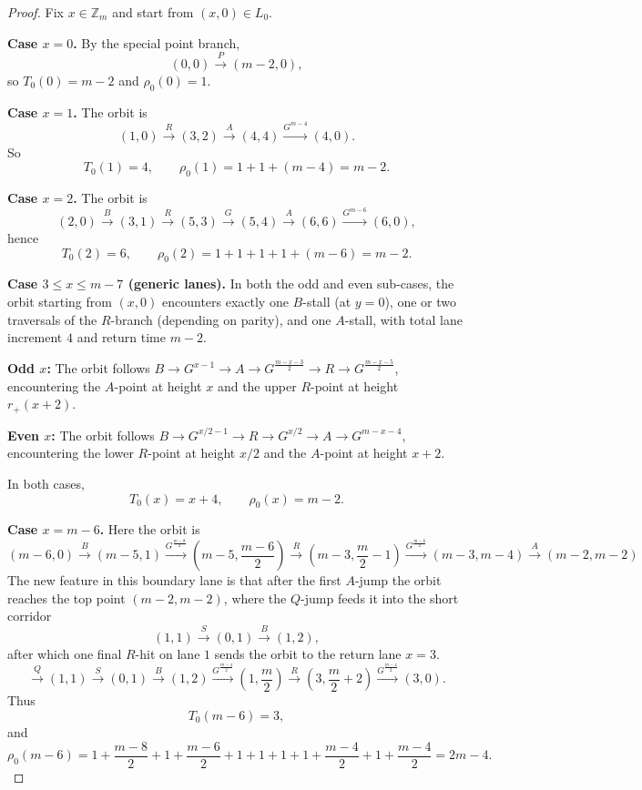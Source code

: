 \documentclass[11pt]{article}
\newcommand{\Zm}{\mathbb Z_m}
\begin{document}
\begin{proof}
Fix $x\in \Zm$ and start from $(x,0)\in L_0$.

\smallskip
\noindent\textbf{Case $x=0$.}
By the special point branch,
\[
(0,0)\xrightarrow{P}(m-2,0),
\]
so $T_0(0)=m-2$ and $\rho_0(0)=1$.

\smallskip
\noindent\textbf{Case $x=1$.}
The orbit is
\[
(1,0)\xrightarrow{R}(3,2)\xrightarrow{A}(4,4)\xrightarrow{G^{m-4}}(4,0).
\]
So
\[
T_0(1)=4,\qquad \rho_0(1)=1+1+(m-4)=m-2.
\]

\smallskip
\noindent\textbf{Case $x=2$.}
The orbit is
\[
(2,0)\xrightarrow{B}(3,1)\xrightarrow{R}(5,3)\xrightarrow{G}(5,4)\xrightarrow{A}(6,6)
\xrightarrow{G^{m-6}}(6,0),
\]
hence
\[
T_0(2)=6,\qquad \rho_0(2)=1+1+1+1+(m-6)=m-2.
\]

\smallskip
\noindent\textbf{Case $3\le x\le m-7$ (generic lanes).}
In both the odd and even sub-cases, the orbit starting from $(x,0)$ encounters exactly one $B$-stall (at $y=0$), one or two traversals of the $R$-branch (depending on parity), and one $A$-stall, with total lane increment $4$ and return time $m-2$.

\smallskip
\noindent\textbf{Odd $x$:}\enspace
The orbit follows $B\to G^{x-1}\to A\to G^{\frac{m-x-3}{2}}\to R\to G^{\frac{m-x-5}{2}}$, encountering the $A$-point at height $x$ and the upper $R$-point at height $r_+(x+2)$.

\smallskip
\noindent\textbf{Even $x$:}\enspace
The orbit follows $B\to G^{x/2-1}\to R\to G^{x/2}\to A\to G^{m-x-4}$, encountering the lower $R$-point at height $x/2$ and the $A$-point at height $x+2$.

\smallskip\noindent
In both cases,
\[
T_0(x)=x+4,\qquad \rho_0(x)=m-2.
\]

\smallskip
\noindent\textbf{Case $x=m-6$.}
Here the orbit is
\[
(m-6,0)\xrightarrow{B}(m-5,1)
\xrightarrow{G^{\frac{m-8}{2}}}\left(m-5,\frac{m-6}{2}\right)\xrightarrow{R}\left(m-3,\frac m2-1\right)
\xrightarrow{G^{\frac{m-6}{2}}}(m-3,m-4)\xrightarrow{A}(m-2,m-2)
\]
The new feature in this boundary lane is that after the first $A$-jump the
orbit reaches the top point $(m-2,m-2)$, where the $Q$-jump feeds it into the
short corridor
\[
(1,1)\xrightarrow{S}(0,1)\xrightarrow{B}(1,2),
\]
after which one final $R$-hit on lane $1$ sends the orbit to the return lane
$x=3$.
\[
\xrightarrow{Q}(1,1)\xrightarrow{S}(0,1)\xrightarrow{B}(1,2)
\xrightarrow{G^{\frac{m-4}{2}}}\left(1,\frac m2\right)\xrightarrow{R}\left(3,\frac m2+2\right)
\xrightarrow{G^{\frac{m-4}{2}}}(3,0).
\]
Thus
\[
T_0(m-6)=3,
\]
and
\[
\rho_0(m-6)=
1+\frac{m-8}{2}+1+\frac{m-6}{2}+1+1+1+1+\frac{m-4}{2}+1+\frac{m-4}{2}
=
2m-4.
\]


\end{proof}
\end{document}
